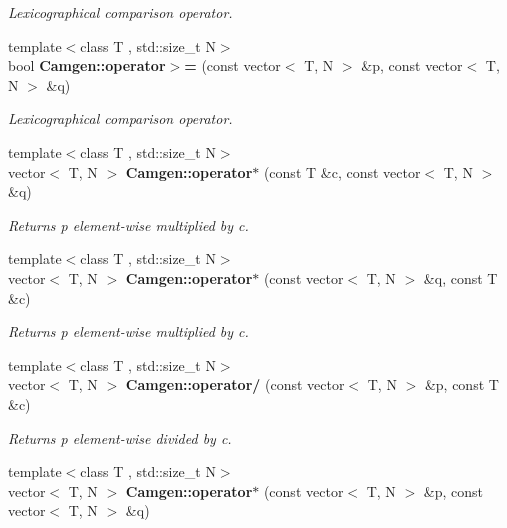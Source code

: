 \begin{DoxyCompactItemize}
\begin{DoxyCompactList}\small\item\em Lexicographical comparison operator. \end{DoxyCompactList}\item 
\hypertarget{a00878_a26880344a337cf3283b1ecb16a8cdea4}{}{\footnotesize template$<$class T , std\+::size\+\_\+t N$>$ }\\bool {\bfseries Camgen\+::operator$>$=} (const vector$<$ T, N $>$ \&p, const vector$<$ T, N $>$ \&q)\label{a00878_a26880344a337cf3283b1ecb16a8cdea4}

\begin{DoxyCompactList}\small\item\em Lexicographical comparison operator. \end{DoxyCompactList}\item 
\hypertarget{a00878_a3fa8c46e04e26a30e4de4ac14c828aed}{}{\footnotesize template$<$class T , std\+::size\+\_\+t N$>$ }\\vector$<$ T, N $>$ {\bfseries Camgen\+::operator$\ast$} (const T \&c, const vector$<$ T, N $>$ \&q)\label{a00878_a3fa8c46e04e26a30e4de4ac14c828aed}

\begin{DoxyCompactList}\small\item\em Returns p element-\/wise multiplied by c. \end{DoxyCompactList}\item 
\hypertarget{a00878_afc7e09f0670848937d884430efdd3635}{}{\footnotesize template$<$class T , std\+::size\+\_\+t N$>$ }\\vector$<$ T, N $>$ {\bfseries Camgen\+::operator$\ast$} (const vector$<$ T, N $>$ \&q, const T \&c)\label{a00878_afc7e09f0670848937d884430efdd3635}

\begin{DoxyCompactList}\small\item\em Returns p element-\/wise multiplied by c. \end{DoxyCompactList}\item 
\hypertarget{a00878_ae413da0d4c6b933c8350f423f3a1ebc4}{}{\footnotesize template$<$class T , std\+::size\+\_\+t N$>$ }\\vector$<$ T, N $>$ {\bfseries Camgen\+::operator/} (const vector$<$ T, N $>$ \&p, const T \&c)\label{a00878_ae413da0d4c6b933c8350f423f3a1ebc4}

\begin{DoxyCompactList}\small\item\em Returns p element-\/wise divided by c. \end{DoxyCompactList}\item 
\hypertarget{a00878_a321558dbfe6bba2978471377d0627cc0}{}{\footnotesize template$<$class T , std\+::size\+\_\+t N$>$ }\\vector$<$ T, N $>$ {\bfseries Camgen\+::operator$\ast$} (const vector$<$ T, N $>$ \&p, const vector$<$ T, N $>$ \&q)\label{a00878_a321558dbfe6bba2978471377d0627cc0}


\end{DoxyCompactItemize}
